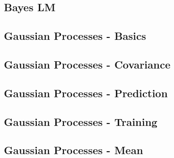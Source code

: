 

\subsection{Bayes LM}

\subsection{Gaussian Processes - Basics}



\subsection{Gaussian Processes - Covariance}

\subsection{Gaussian Processes - Prediction}

\subsection{Gaussian Processes - Training}

\subsection{Gaussian Processes - Mean}

